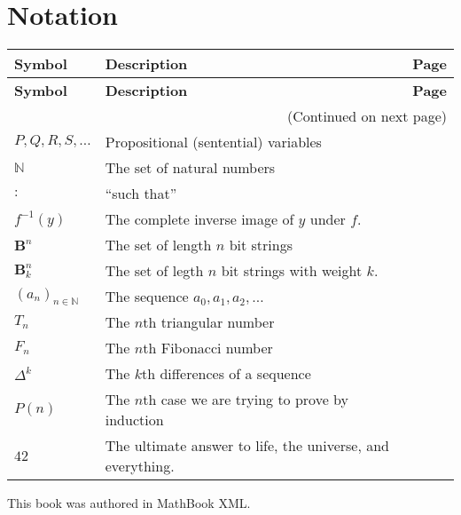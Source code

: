 \documentclass[10pt,]{book}
\theoremstyle{plain}
\theoremstyle{definition}
\theoremstyle{definition}
\theoremstyle{definition}
\numberwithin{equation}{chapter}
\def\N{\mathbb N}
\def\B{\mathbf{B}}
\def\inv{^{-1}}
\def\st{:}
\begin{document}
\chapter[Notation]{Notation}\label{appendix-2}
\begin{longtable}[l]{llr}
\textbf{Symbol}&\textbf{Description}&\textbf{Page}\\[1em]
\endfirsthead
\textbf{Symbol}&\textbf{Description}&\textbf{Page}\\[1em]
\endhead
\multicolumn{3}{r}{(Continued on next page)}\\
\endfoot
\endlastfoot
$
                    P, Q, R, S, \ldots
                $&Propositional (sentential) variables&\pageref{notation-1}\\
$\N$&The set of natural numbers&\pageref{notation-2}\\
$\st$&``such that''&\pageref{notation-3}\\
$f\inv(y)$&The complete inverse image of \(y\) under \(f\).&\pageref{notation-4}\\
$\B^n$&The set of length \(n\) bit strings&\pageref{notation-5}\\
$\B^n_k$&The set of legth \(n\) bit strings with weight \(k\).&\pageref{notation-6}\\
$(a_n)_{n \in \N}$&The sequence \(a_0, a_1, a_2, \ldots\)&\pageref{notation-7}\\
$T_n$&The \(n\)th triangular number&\pageref{notation-8}\\
$F_n$&The \(n\)th Fibonacci number&\pageref{notation-9}\\
$\Delta^k$&The \(k\)th differences of a sequence&\pageref{notation-10}\\
$P(n)$&The \(n\)th case we are trying to prove by induction&\pageref{notation-11}\\
$42$&The ultimate answer to life, the universe, and everything.&\pageref{notation-12}\\
\end{longtable}
%
\backmatter
%
%
\printindex
%
\cleardoublepage
\pagestyle{empty}
\centerline{
    This book was authored in MathBook XML.
}
\end{document}
